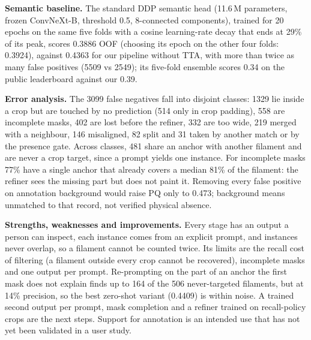 \documentclass[sigconf]{acmart}
\begin{document}
\textbf{Semantic baseline.} The standard DDP semantic head (11.6\,M parameters, frozen ConvNeXt-B, threshold 0.5,
8-connected components), trained for 20 epochs on the same five folds with a cosine learning-rate decay that ends at
29\% of its peak, scores 0.3886 OOF (choosing its epoch on the other four folds: 0.3924), against 0.4363 for our
pipeline without TTA, with
more than twice as many false positives (5509 vs 2549); its five-fold ensemble scores 0.34 on the public leaderboard
against our 0.39.

\textbf{Error analysis.} The 3099 false negatives fall into disjoint classes: 1329 lie inside a crop but are touched by
no prediction (514 only in crop padding), 558 are incomplete masks, 402 are lost before the refiner, 332 are too wide,
219 merged with a neighbour, 146 misaligned, 82 split and 31 taken by another match or by the presence gate. Across
classes, 481 share an anchor with another filament and are never a crop target, since a prompt yields one instance.
For incomplete masks 77\% have a single anchor that already covers a median 81\% of the filament: the refiner sees the
missing part but does not paint it. Removing every false positive on annotation background would raise PQ only to
0.473; background means unmatched to that record, not verified physical absence.

\textbf{Strengths, weaknesses and improvements.} Every stage has an output a person can inspect, each instance comes
from an explicit prompt, and instances never overlap, so a filament cannot be counted twice. Its limits are
the recall cost of filtering (a filament outside every crop cannot be recovered), incomplete masks and one output per
prompt. Re-prompting on the part of an anchor the first mask does not explain finds up to 164 of the 506
never-targeted filaments, but at 14\% precision, so the best zero-shot variant (0.4409) is within noise. A trained
second output per prompt, mask completion and a refiner trained on recall-policy crops are the next steps. Support
for annotation is an intended use that has not yet been validated in a user study.

\end{document}
